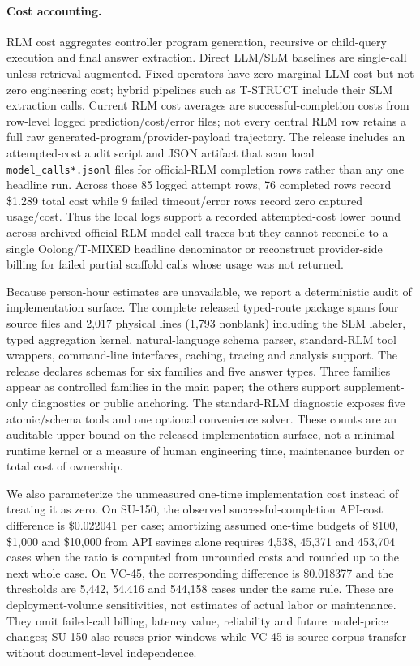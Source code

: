\paragraph{Cost accounting.}
RLM cost aggregates controller program generation, recursive or child-query execution and final answer extraction. Direct LLM/SLM baselines are single-call unless retrieval-augmented. Fixed operators have zero marginal LLM cost but not zero engineering cost; hybrid pipelines such as T-STRUCT include their SLM extraction calls. Current RLM cost averages are successful-completion costs from row-level logged prediction/cost/error files; not every central RLM row retains a full raw generated-program/provider-payload trajectory. The release includes an attempted-cost audit script and JSON artifact that scan local \texttt{model\_calls*.jsonl} files for official-RLM completion rows rather than any one headline run. Across those 85 logged attempt rows, 76 completed rows record \$1.289 total cost while 9 failed timeout/error rows record zero captured usage/cost. Thus the local logs support a recorded attempted-cost lower bound across archived official-RLM model-call traces but they cannot reconcile to a single Oolong/T-MIXED headline denominator or reconstruct provider-side billing for failed partial scaffold calls whose usage was not returned.

Because person-hour estimates are unavailable, we report a deterministic audit of implementation surface. The complete released typed-route package spans four source files and 2,017 physical lines (1,793 nonblank) including the SLM labeler, typed aggregation kernel, natural-language schema parser, standard-RLM tool wrappers, command-line interfaces, caching, tracing and analysis support. The release declares schemas for six families and five answer types. Three families appear as controlled families in the main paper; the others support supplement-only diagnostics or public anchoring. The standard-RLM diagnostic exposes five atomic/schema tools and one optional convenience solver. These counts are an auditable upper bound on the released implementation surface, not a minimal runtime kernel or a measure of human engineering time, maintenance burden or total cost of ownership.

We also parameterize the unmeasured one-time implementation cost instead of treating it as zero. On SU-150, the observed successful-completion API-cost difference is \$0.022041 per case; amortizing assumed one-time budgets of \$100, \$1,000 and \$10,000 from API savings alone requires 4,538, 45,371 and 453,704 cases when the ratio is computed from unrounded costs and rounded up to the next whole case. On VC-45, the corresponding difference is \$0.018377 and the thresholds are 5,442, 54,416 and 544,158 cases under the same rule. These are deployment-volume sensitivities, not estimates of actual labor or maintenance. They omit failed-call billing, latency value, reliability and future model-price changes; SU-150 also reuses prior windows while VC-45 is source-corpus transfer without document-level independence.


